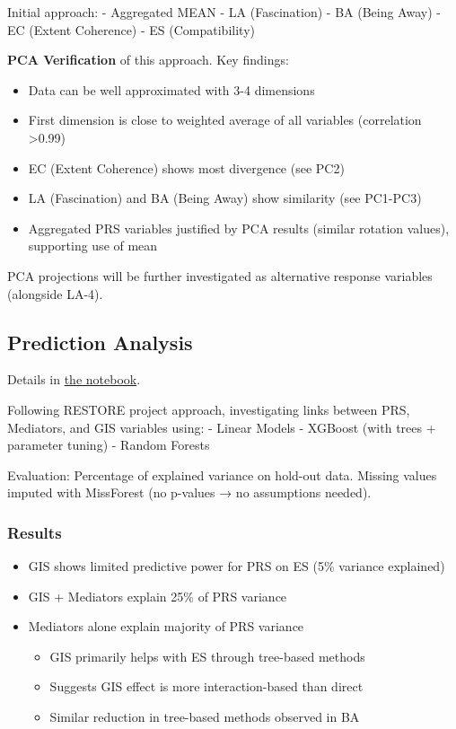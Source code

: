 \documentclass[
  letterpaper,
  DIV=11,
  numbers=noendperiod]{scrartcl}
\providecommand{\tightlist}{%
  \setlength{\itemsep}{0pt}\setlength{\parskip}{0pt}}\usepackage{longtable,booktabs,array}
\begin{document}
Initial approach: - Aggregated MEAN - LA (Fascination) - BA (Being Away)
- EC (Extent Coherence) - ES (Compatibility)

\textbf{PCA Verification} of this approach. Key findings:

\begin{itemize}
\tightlist
\item
  Data can be well approximated with 3-4 dimensions
\item
  First dimension is close to weighted average of all variables
  (correlation \textgreater0.99)
\item
  EC (Extent Coherence) shows most divergence (see PC2)
\item
  LA (Fascination) and BA (Being Away) show similarity (see PC1-PC3)
\item
  Aggregated PRS variables justified by PCA results (similar rotation
  values), supporting use of mean
\end{itemize}

PCA projections will be further investigated as alternative response
variables (alongside LA-4).

\subsection{Prediction Analysis}\label{prediction-analysis}

Details in \href{notebooks/mlr3.qmd}{the notebook}.

Following RESTORE project approach, investigating links between PRS,
Mediators, and GIS variables using: - Linear Models - XGBoost (with
trees + parameter tuning) - Random Forests

Evaluation: Percentage of explained variance on hold-out data. Missing
values imputed with MissForest (no p-values → no assumptions needed).

\subsubsection{Results}\label{results}

\begin{itemize}
\tightlist
\item
  GIS shows limited predictive power for PRS on ES (5\% variance
  explained)
\item
  GIS + Mediators explain 25\% of PRS variance
\item
  Mediators alone explain majority of PRS variance

  \begin{itemize}
  \tightlist
  \item
    GIS primarily helps with ES through tree-based methods
  \item
    Suggests GIS effect is more interaction-based than direct
  \item
    Similar reduction in tree-based methods observed in BA
  \end{itemize}
\end{itemize}
\end{document}

